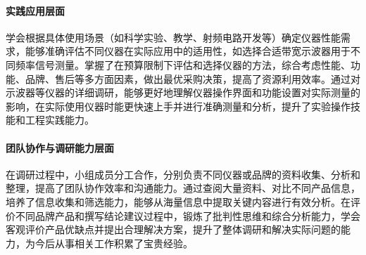 \documentclass[./测控三级项目.tex]{subfiles} %
\begin{document}
		\paragraph{\qquad 实践应用层面}
		学会根据具体使用场景（如科学实验、教学、射频电路开发等）确定仪器性能需求，能够准确评估不同仪器在实际应用中的适用性，如选择合适带宽示波器用于不同频率信号测量。掌握了在预算限制下评估和选择仪器的方法，综合考虑性能、功能、品牌、售后等多方面因素，做出最优采购决策，提高了资源利用效率。通过对示波器等仪器的详细调研，能够更好地理解仪器操作界面和功能设置对实际测量的影响，在实际使用仪器时能更快速上手并进行准确测量和分析，提升了实验操作技能和工程实践能力。
		\paragraph{\qquad 团队协作与调研能力层面}
		在调研过程中，小组成员分工合作，分别负责不同仪器或品牌的资料收集、分析和整理，提高了团队协作效率和沟通能力。通过查阅大量资料、对比不同产品信息，培养了信息收集和筛选能力，能够从海量信息中提取关键内容进行有效分析。在评价不同品牌产品和撰写结论建议过程中，锻炼了批判性思维和综合分析能力，学会客观评价产品优缺点并提出合理解决方案，提升了整体调研和解决实际问题的能力，为今后从事相关工作积累了宝贵经验。
		
	
	
\end{document}
